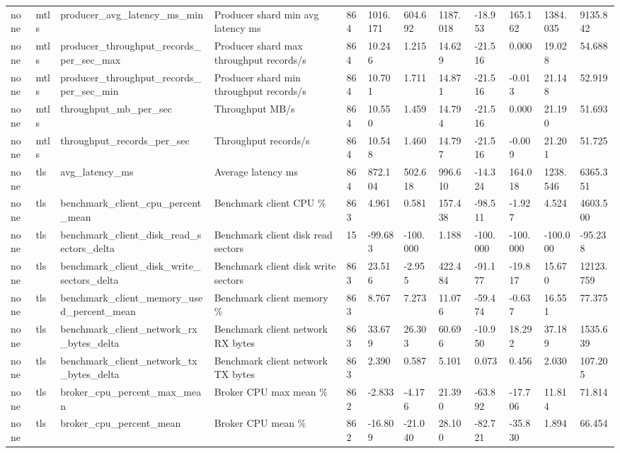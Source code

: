 \begin{longtable}{llllllllllll}
none & mtls & producer\_avg\_latency\_ms\_min & Producer shard min avg latency ms & 864 & 1016.171 & 604.692 & 1187.018 & -18.953 & 165.162 & 1384.035 & 9135.842 \\
none & mtls & producer\_throughput\_records\_per\_sec\_max & Producer shard max throughput records/s & 864 & 10.246 & 1.215 & 14.629 & -21.516 & 0.000 & 19.028 & 54.688 \\
none & mtls & producer\_throughput\_records\_per\_sec\_min & Producer shard min throughput records/s & 864 & 10.701 & 1.711 & 14.871 & -21.516 & -0.013 & 21.148 & 52.919 \\
none & mtls & throughput\_mb\_per\_sec & Throughput MB/s & 864 & 10.550 & 1.459 & 14.794 & -21.516 & 0.000 & 21.190 & 51.693 \\
none & mtls & throughput\_records\_per\_sec & Throughput records/s & 864 & 10.548 & 1.460 & 14.797 & -21.516 & -0.009 & 21.201 & 51.725 \\
none & tls & avg\_latency\_ms & Average latency ms & 864 & 872.104 & 502.618 & 996.610 & -14.324 & 164.018 & 1238.546 & 6365.351 \\
none & tls & benchmark\_client\_cpu\_percent\_mean & Benchmark client CPU \% & 863 & 4.961 & 0.581 & 157.438 & -98.511 & -1.927 & 4.524 & 4603.500 \\
none & tls & benchmark\_client\_disk\_read\_sectors\_delta & Benchmark client disk read sectors & 15 & -99.683 & -100.000 & 1.188 & -100.000 & -100.000 & -100.000 & -95.238 \\
none & tls & benchmark\_client\_disk\_write\_sectors\_delta & Benchmark client disk write sectors & 863 & 23.516 & -2.955 & 422.484 & -91.177 & -19.817 & 15.670 & 12123.759 \\
none & tls & benchmark\_client\_memory\_used\_percent\_mean & Benchmark client memory \% & 863 & 8.767 & 7.273 & 11.076 & -59.474 & -0.637 & 16.551 & 77.375 \\
none & tls & benchmark\_client\_network\_rx\_bytes\_delta & Benchmark client network RX bytes & 863 & 33.679 & 26.303 & 60.696 & -10.950 & 18.292 & 37.189 & 1535.639 \\
none & tls & benchmark\_client\_network\_tx\_bytes\_delta & Benchmark client network TX bytes & 863 & 2.390 & 0.587 & 5.101 & 0.073 & 0.456 & 2.030 & 107.205 \\
none & tls & broker\_cpu\_percent\_max\_mean & Broker CPU max mean \% & 862 & -2.833 & -4.176 & 21.390 & -63.892 & -17.706 & 11.814 & 71.814 \\
none & tls & broker\_cpu\_percent\_mean & Broker CPU mean \% & 862 & -16.809 & -21.040 & 28.100 & -82.721 & -35.830 & 1.894 & 66.454 \\

\end{longtable}

